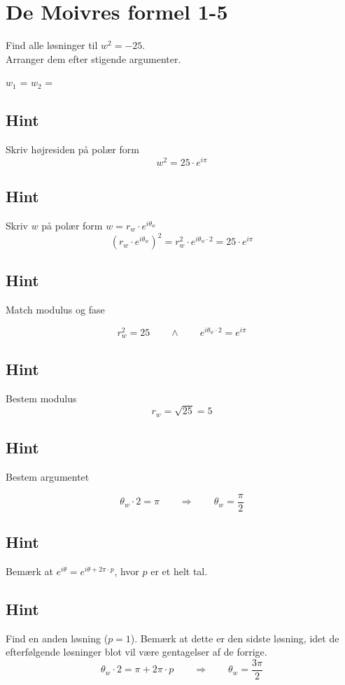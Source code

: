 \documentclass{article}
\newenvironment{exercise}[1]{\newpage\section{#1}}{}
\newcommand{\answerbox}[1]{\fbox{$#1$}}
\newcommand{\hint}{\subsection*{Hint}}
\begin{document}
\begin{exercise}{De Moivres formel 1-5}
	
	Find alle løsninger til $w^2=-25$. \\
	Arranger dem efter stigende argumenter.
	
	$w_1$ = \answerbox{5 \cdot e^{i \frac{\pi}{2}}}		$w_2$ = \answerbox{5 \cdot e^{i \frac{3 \pi}{2}}}		
	
	
	\hint 
	
	Skriv højresiden på polær form
	\[
	w^2 = 25 \cdot e^{i \pi}
	\]
	
	
	\hint
	
	Skriv $w$ på polær form $w = r_w \cdot e^{i \theta_w}$
	\[
	\left(r_w \cdot e^{i \theta_w}\right)^2 = r_w^2 \cdot e^{i \theta_w \cdot 2} = 25 \cdot e^{i \pi}
	\]
	
	\hint 
	Match modulus og fase
	
	\[
	r_w^2 = 25 \qquad \wedge \qquad e^{i \theta_w \cdot 2} = e^{i \pi}
	\]
	
	\hint
	
	Bestem modulus
	\[
	r_w  =  \sqrt{25} = 5
	\]
	
	\hint
	
	Bestem argumentet
	
	\[
	\theta_w \cdot 2 = \pi \qquad \Rightarrow \qquad  \theta_w = \frac{\pi}{2}
	\]
	
	\hint
	
	Bemærk at $e^{i \theta} = e^{i \theta + 2 \pi \cdot p}$, hvor $p$ er et helt tal.
	
	\hint
	
	Find en anden løsning ($p=1$). Bemærk at dette er den sidste løsning, idet de efterfølgende løsninger blot vil være gentagelser af de forrige.
	\[
	\theta_w \cdot 2 = \pi  + 2 \pi \cdot p \qquad \Rightarrow \qquad  \theta_w = \frac{3 \pi}{2}
	\]
	

	
\end{exercise}
\end{document}
